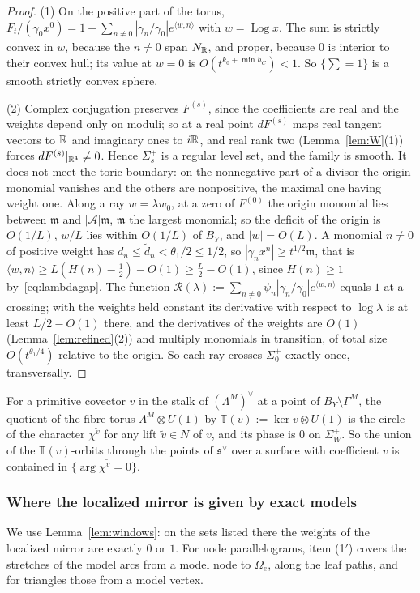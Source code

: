 \begin{proof}
(1) On the positive part of the torus, $F_t/(\gamma_0x^0)=1-\sum_{n\ne0}|\gamma_n/\gamma_0|e^{\langle w,n\rangle}$ with
$w=\operatorname{Log}x$. The sum is strictly convex in $w$, because the $n\ne0$ span $N_\mathbb R$, and proper, because $0$ is
interior to their convex hull; its value at $w=0$ is $O(t^{k_0+\min h_C})<1$. So $\{\sum=1\}$ is a smooth strictly convex
sphere.

(2) Complex conjugation preserves $F^{(s)}$, since the coefficients are real and the weights depend only on moduli; so
at a real point $dF^{(s)}$ maps real tangent vectors to $\mathbb R$ and imaginary ones to $i\mathbb R$, and real rank two
(Lemma~\ref{lem:W}(1)) forces $dF^{(s)}|_{\mathbb R^4}\ne0$. Hence $\Sigma^+_s$ is a regular level set, and the family is smooth.
It does not meet the toric boundary: on the nonnegative part of a divisor the origin monomial vanishes and the others are
nonpositive, the maximal one having weight one. Along a ray $w=\lambda w_0$, at a zero of $F^{(0)}$ the origin monomial
lies between $\mathfrak m$ and $|\mathcal A|\mathfrak m$, $\mathfrak m$ the largest monomial; so the deficit of the origin is
$O(1/L)$, $w/L$ lies within $O(1/L)$ of $B_Y$, and $|w|=O(L)$. A monomial $n\ne0$ of positive weight has
$d_n\le\tilde d_n<\theta_1/2\le1/2$, so $|\gamma_nx^n|\ge t^{1/2}\mathfrak m$, that is $\langle w,n\rangle\ge
L(H(n)-\tfrac12)-O(1)\ge\tfrac L2-O(1)$, since $H(n)\ge1$ by~\eqref{eq:lambdagap}. The function
$\mathscr R(\lambda):=\sum_{n\ne0}\psi_n|\gamma_n/\gamma_0|e^{\langle w,n\rangle}$ equals $1$ at a crossing; with the weights
held constant its derivative with respect to $\log\lambda$ is at least $L/2-O(1)$ there, and the derivatives of the weights
are $O(1)$ (Lemma~\ref{lem:refined}(2)) and multiply monomials in transition, of total size $O(t^{\theta_1/4})$ relative to
the origin. So each ray crosses $\Sigma^+_0$ exactly once, transversally.
\end{proof}

For a primitive covector $v$ in the stalk of $(\Lambda^M)^\vee$ at a point of $B_Y\setminus\Gamma^M$, the quotient of the
fibre torus $\Lambda^M\otimes U(1)$ by $\mathbb T(v):=\ker v\otimes U(1)$ is the circle of the character $\chi^{\tilde v}$
for any lift $\tilde v\in N$ of $v$, and its phase is $0$ on $\Sigma^+_W$. So the union of the $\mathbb T(v)$-orbits
through the points of $\mathfrak s^\vee$ over a surface with coefficient $v$ is contained in $\{\arg\chi^{\tilde v}=0\}$.

\subsubsection*{Where the localized mirror is given by exact models}
We use Lemma~\ref{lem:windows}: on the sets listed there the weights of the localized mirror are exactly $0$ or $1$. For
node parallelograms, item (1$'$) covers the stretches of the model arcs from a model node to $\Omega_e$, along the leaf
paths, and for triangles those from a model vertex.

